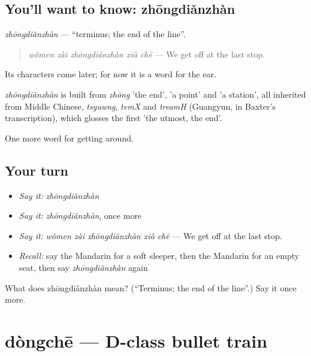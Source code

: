 \subsection*{You'll want to know: zhōngdiǎnzhàn}
\emph{zhōngdiǎnzhàn} — \textquotedblleft{}terminus; the end of the line\textquotedblright{}.

\begin{quote}
\emph{wǒmen zài zhōngdiǎnzhàn xià chē} — We get off at the last stop.
\end{quote}

Its characters come later; for now it is a word for the ear.

\begin{cousinweb}
\emph{zhōngdiǎnzhàn} is built from \emph{zhōng} 'the end',  'a point' and  'a station', all inherited from Middle Chinese, \emph{tsyuwng}, \emph{temX} and \emph{treamH} (Guangyun, in Baxter's transcription), which glosses the first 'the utmost, the end'.
\end{cousinweb}

\begin{grammarlens}[title={What you've built}]
One more word for getting around.
\end{grammarlens}

\subsection*{Your turn}
\begin{itemize}
\raggedright
  \item \emph{Say it:} \emph{zhōngdiǎnzhàn}
  \item \emph{Say it:} \emph{zhōngdiǎnzhàn}, once more
  \item \emph{Say it:} \emph{wǒmen zài zhōngdiǎnzhàn xià chē} — We get off at the last stop.
  \item \emph{Recall:} say the Mandarin for a soft sleeper, then the Mandarin for an empty seat, then say \emph{zhōngdiǎnzhàn} again
\end{itemize}

\begin{tcolorbox}[breakable,colback=teal!4,colframe=teal!35!black,title={Before you move on}]
What does zhōngdiǎnzhàn mean? (\textquotedblleft{}Terminus; the end of the line\textquotedblright{}.) Say it once more.
\end{tcolorbox}
\section[dòngchē]{dòngchē — D-class bullet train}


